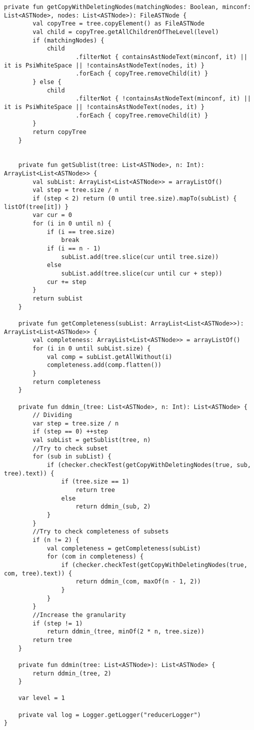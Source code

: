 \begin{lstlisting}[caption = Исходный код файла HierarchialDeltaDebugger.kt]
    private fun getCopyWithDeletingNodes(matchingNodes: Boolean, minconf: List<ASTNode>, nodes: List<ASTNode>): FileASTNode {
        val copyTree = tree.copyElement() as FileASTNode
        val child = copyTree.getAllChildrenOfTheLevel(level)
        if (matchingNodes) {
            child
                    .filterNot { containsAstNodeText(minconf, it) || it is PsiWhiteSpace || !containsAstNodeText(nodes, it) }
                    .forEach { copyTree.removeChild(it) }
        } else {
            child
                    .filterNot { !containsAstNodeText(minconf, it) || it is PsiWhiteSpace || !containsAstNodeText(nodes, it) }
                    .forEach { copyTree.removeChild(it) }
        }
        return copyTree
    }


    private fun getSublist(tree: List<ASTNode>, n: Int): ArrayList<List<ASTNode>> {
        val subList: ArrayList<List<ASTNode>> = arrayListOf()
        val step = tree.size / n
        if (step < 2) return (0 until tree.size).mapTo(subList) { listOf(tree[it]) }
        var cur = 0
        for (i in 0 until n) {
            if (i == tree.size)
                break
            if (i == n - 1)
                subList.add(tree.slice(cur until tree.size))
            else
                subList.add(tree.slice(cur until cur + step))
            cur += step
        }
        return subList
    }

    private fun getCompleteness(subList: ArrayList<List<ASTNode>>): ArrayList<List<ASTNode>> {
        val completeness: ArrayList<List<ASTNode>> = arrayListOf()
        for (i in 0 until subList.size) {
            val comp = subList.getAllWithout(i)
            completeness.add(comp.flatten())
        }
        return completeness
    }

    private fun ddmin_(tree: List<ASTNode>, n: Int): List<ASTNode> {
        // Dividing
        var step = tree.size / n
        if (step == 0) ++step
        val subList = getSublist(tree, n)
        //Try to check subset
        for (sub in subList) {
            if (checker.checkTest(getCopyWithDeletingNodes(true, sub, tree).text)) {
                if (tree.size == 1)
                    return tree
                else
                    return ddmin_(sub, 2)
            }
        }
        //Try to check completeness of subsets
        if (n != 2) {
            val completeness = getCompleteness(subList)
            for (com in completeness) {
                if (checker.checkTest(getCopyWithDeletingNodes(true, com, tree).text)) {
                    return ddmin_(com, maxOf(n - 1, 2))
                }
            }
        }
        //Increase the granularity
        if (step != 1)
            return ddmin_(tree, minOf(2 * n, tree.size))
        return tree
    }

    private fun ddmin(tree: List<ASTNode>): List<ASTNode> {
        return ddmin_(tree, 2)
    }

    var level = 1

    private val log = Logger.getLogger("reducerLogger")
}
\end{lstlisting}

